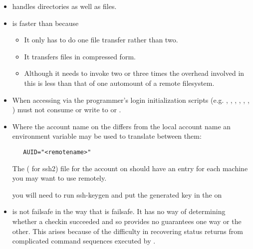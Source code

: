 \begin{itemize}
\item
    handles directories as well as files.

\item
    is faster than  because

   \begin{itemize}
   \item
      It only has to do one file transfer rather than two.

   \item
      It transfers files in compressed form.

   \item
      Although it needs to invoke  two or three times the
      overhead involved in this is less than that of one automount of a
      remote filesystem.
   \end{itemize}

\item
   When accessing  via  the programmer's
   login initialization scripts (e.g. , ,
   , , , , )
   must not consume  or write to  or .

\item
   Where the account name on the  differs from the local
   account name an environment variable may be used to translate between them:

\begin{verbatim}
   AUID="<remotename>"
\end{verbatim}

   \noindent

   The   ( for ssh2)
   file for the  account on
    should have an entry for each machine you may want
   to use remotely.

   \noindent
   you will need to run ssh-keygen and put the generated key in the 
    on 

\item
    is not failsafe in the way that  is failsafe.  It has
   no way of determining whether a checkin succeeded and so provides no
   guarantees one way or the other.  This arises because of the difficulty in
   recovering status returns from complicated command sequences executed by
   .


\end{itemize}
